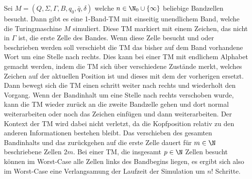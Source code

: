 \documentclass[listings, a4paper, 11pt]{homeworkassignment}
\begin{document}
Sei \(M = (Q, Σ, Γ, B, q_0 , \bar q, δ)\) welche \(n \in
\N_0\cup\{\infty\}\) beliebige Bandzellen besucht.
Dann gibt es eine 1-Band-TM mit
einseitig unendlichem Band, welche die Turingmaschine \(M\)
simuliert. Diese TM markiert mit einem Zeichen, das nicht in
\(Γ\) ist, die erste Zelle des Bandes. Wenn diese Zelle besucht
und oder beschrieben werden soll verschiebt die TM das bisher auf dem
Band vorhandene Wort um eine Stelle nach rechts. Dies kann bei einer
TM mit endlichem Alphabet gemacht werden, indem die TM sich über
verschiedene Zustände merkt, welches Zeichen auf der aktuellen
Position ist und dieses mit dem der vorherigen ersetzt. Dann bewegt
sich die TM einen schritt weiter nach rechts und wiederholt den
Vorgang. Wenn der Bandinhalt um eine Stelle nach rechts verschoben
wurde, kann die TM wieder zurück an die zweite Bandzelle gehen und
dort normal weiterarbeiten oder noch das Zeichen einfügen und dann
weiterarbeiten. Der Kontext der TM wird dabei nicht verletzt, da die
Kopfposition relativ zu den anderen Informationen bestehen bleibt. Das
verschieben des gesamten Bandinhalts und das zurückgehen auf die erste
Zelle dauert für \(m \in \N\) beschriebene Zellen \(2m\). Bei einer
TM, die insgesamt \(p\in\N\) Zellen besucht können im Worst-Case alle
Zellen links des Bandbegins liegen, es ergibt sich also im Worst-Case
eine Verlangsamung der Laufzeit der Simulation um \(n!\) Schritte. 
\end{document}
